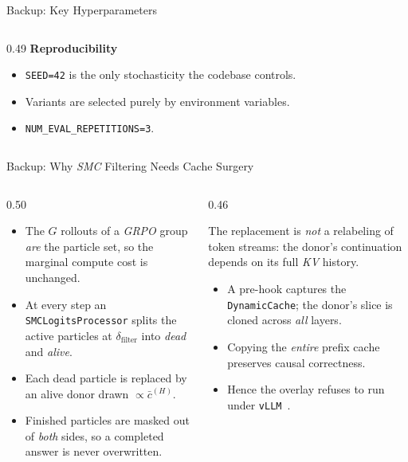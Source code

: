 \documentclass[aspectratio=169,10pt,t]{beamer}
\DeclareRobustCommand{\acit}[1]{\textit{\acs{#1}}}
\newcommand{\headline}[1]{%
	\setlength{\fboxsep}{4pt}%
	\noindent\colorbox{jkulight}{%
		\begin{minipage}{\dimexpr\textwidth-2\fboxsep\relax}%
			\footnotesize\raggedright\color{jkunavy}#1%
		\end{minipage}}%
	\vspace{0.18cm}%
}
\newcommand{\lead}[1]{{\color{jkunavy}\textbf{#1}}\par\vspace{1pt}}
\begin{document}
\begin{frame}[noframenumbering]{Backup: Key Hyperparameters}
\begin{columns}[T, onlytextwidth]
\begin{column}{0.49\textwidth}
			\lead{Reproducibility}
			\begin{itemize}
				\item \texttt{SEED=42} is the only stochasticity the codebase controls.
				\item Variants are selected purely by environment variables.
				\item \texttt{NUM\_EVAL\_REPETITIONS=3}.
			\end{itemize}
		\end{column}
	\end{columns}
\end{frame}

\begin{frame}[noframenumbering]{Backup: Why \acit{SMC} Filtering Needs Cache Surgery}
	\begin{columns}[T, onlytextwidth]
		\begin{column}{0.50\textwidth}
			\begin{itemize}
				\setlength{\itemsep}{4pt}
				\item The $G$ rollouts of a \acit{GRPO} group \emph{are} the particle set, so the marginal compute cost is unchanged.
				\item At every step an \texttt{SMCLogitsProcessor} splits the active particles at $\delta_{\mathrm{filter}}$ into \emph{dead} and \emph{alive}.
				\item Each dead particle is replaced by an alive donor drawn $\propto \bar c^{(H)}$.
				\item Finished particles are masked out of \emph{both} sides, so a completed answer is never overwritten.
			\end{itemize}
		\end{column}
		\begin{column}{0.46\textwidth}
			\headline{The replacement is \emph{not} a relabeling of token streams: the donor's continuation depends on its full \acit{KV} history.}
			\begin{itemize}
				\setlength{\itemsep}{4pt}
				\item A pre-hook captures the \texttt{DynamicCache}; the donor's slice is cloned across \emph{all} layers.
				\item Copying the \emph{entire} prefix cache preserves causal correctness.
				\item Hence the overlay refuses to run under \texttt{vLLM}~\citep{vllm}.
			\end{itemize}
		\end{column}
	\end{columns}
\end{frame}
\end{document}
